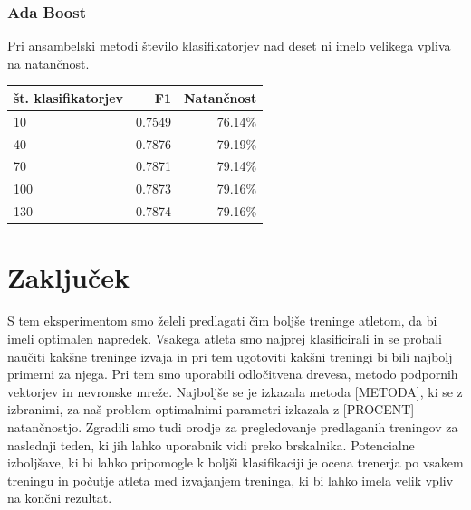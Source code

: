 \documentclass{acm_proc_article-sp}
\begin{document}
\subsubsection{Ada Boost}
Pri ansambelski metodi število klasifikatorjev nad deset ni imelo velikega vpliva na natančnost.
\begin{center}
 \small
 \setlength{\tabcolsep}{3pt}
 \begin{tabular}{|l r r|}
 \hline
   št. klasifikatorjev & F1 & Natančnost \\
  \hline \hline
  10 & 0.7549 & 76.14\% \\
  \hline
  40 & 0.7876 & 79.19\% \\
  \hline
  70 & 0.7871 & 79.14\% \\
  \hline
  100 & 0.7873 & 79.16\% \\
  \hline
  130 & 0.7874 & 79.16\% \\
  \hline
 \end{tabular}
\end{center}
\normalsize


\section{Zaključek}
S tem eksperimentom smo želeli predlagati čim boljše treninge atletom, da bi imeli optimalen napredek.
Vsakega atleta smo najprej klasificirali in se probali naučiti kakšne treninge izvaja in pri tem ugotoviti kakšni treningi bi bili najbolj primerni za njega.
Pri tem smo uporabili odločitvena drevesa, metodo podpornih vektorjev in nevronske mreže.
Najboljše se je izkazala metoda [METODA], ki se z izbranimi, za naš problem optimalnimi parametri izkazala z [PROCENT] natančnostjo.
Zgradili smo tudi orodje za pregledovanje predlaganih treningov za naslednji teden, ki jih lahko uporabnik vidi preko brskalnika.
Potencialne izboljšave, ki bi lahko pripomogle k boljši klasifikaciji je ocena trenerja po vsakem treningu in počutje atleta med izvajanjem treninga, ki bi lahko imela velik vpliv na končni rezultat.

%

%
%

\balancecolumns
\end{document}
